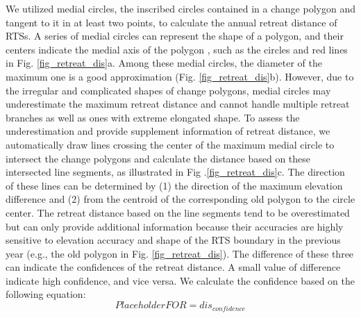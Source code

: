 \documentclass[authoryear,preprint,review,12pt]{elsarticle}
\begin{document}

We utilized medial circles, the inscribed circles contained in a change polygon and tangent to it in at least two points, to calculate the annual retreat distance of RTSs. 
A series of medial circles can represent the shape of a polygon, and their centers indicate the medial axis of the polygon \citep{zhu2014computing}, such as the circles and red lines in Fig. \ref{fig_retreat_dis}a. 
Among these medial circles, the diameter of the maximum one is a good approximation (Fig. \ref{fig_retreat_dis}b).
However, due to the irregular and complicated shapes of change polygons, medial circles may underestimate the maximum retreat distance and cannot handle multiple retreat branches as well as ones with extreme elongated shape. 
To assess the underestimation and provide supplement information of retreat distance, we automatically draw lines crossing the center of the maximum medial circle to intersect the change polygons and calculate the distance based on these intersected line segments, as illustrated in Fig .\ref{fig_retreat_dis}c. 
The direction of these lines can be determined by (1) the direction of the maximum elevation difference and (2) from the centroid of the corresponding old polygon to the circle center. 
The retreat distance based on the line segments tend to be overestimated but can only provide additional information because their accuracies are highly sensitive to elevation accuracy and shape of the RTS boundary in the previous year (e.g., the old polygon in Fig. \ref{fig_retreat_dis}). 
The difference of these three can indicate the confidences of the retreat distance. A small value of difference indicate high confidence, and vice versa. 
We calculate the confidence based on the following equation: 
\begin{equation}
PlaceholderFOR=dis_{confidence}
\label{equ_dis_confid}
\end{equation}



\end{document}
